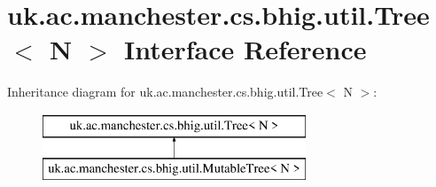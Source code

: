 \hypertarget{interfaceuk_1_1ac_1_1manchester_1_1cs_1_1bhig_1_1util_1_1_tree_3_01_n_01_4}{\section{uk.\-ac.\-manchester.\-cs.\-bhig.\-util.\-Tree$<$ N $>$ Interface Reference}
\label{interfaceuk_1_1ac_1_1manchester_1_1cs_1_1bhig_1_1util_1_1_tree_3_01_n_01_4}
}
Inheritance diagram for uk.\-ac.\-manchester.\-cs.\-bhig.\-util.\-Tree$<$ N $>$\-:\begin{figure}[H]
\begin{center}
\leavevmode
\includegraphics[height=2.000000cm]{interfaceuk_1_1ac_1_1manchester_1_1cs_1_1bhig_1_1util_1_1_tree_3_01_n_01_4}
\end{center}
\end{figure}

